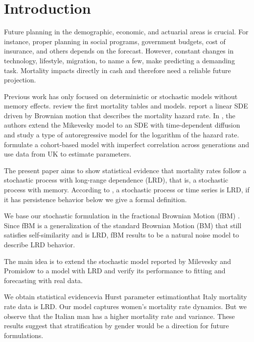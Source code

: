 \documentclass[smallextended]{svjour3}
\begin{document}
\section{Introduction} \label{intro}

        Future planning in the demographic, economic, and actuarial areas is
    crucial. For instance, proper planning in social programs, government
    budgets, cost of insurance, and others depends on the forecast. However,
    constant changes in technology, lifestyle, migration, to name a few, make
    predicting a demanding task.  Mortality impacts directly in cash and
    therefore need a reliable future projection.

        Previous work has only focused on deterministic or stochastic models
    without memory effects. \cite{pitacco2009modelling} review 
    the first mortality tables and models.
    \cite{mi-pr} report a linear SDE driven by Brownian motion that describes
    the mortality hazard rate. In \cite{gi-or-be}, the authors extend the
    Mikevesky model to an SDE with time-dependent diffusion and study a type of
    autoregressive model for the logarithm of the hazard rate.   
    \cite{je-lu-vi} formulate a cohort-based model with imperfect correlation
    across generations and use data from UK to estimate parameters.

        The present paper aims to show statistical evidence that mortality rates
    follow a stochastic process with long-range dependence (LRD), that is,
    a stochastic process with memory. According to \cite{ra}, a stochastic
    process or time series is LRD, if it has persistence behavior\textemdash
    below we give a formal definition.

        We base our stochastic formulation in the fractional Brownian Motion (fBM)
    \cite{ma-va}. Since fBM is a generalization of the standard Brownian Motion (BM)
    that still satisfies self-similarity and is LRD, fBM results to be a natural
    noise model to describe LRD behavior.

        The main idea is to extend the stochastic model reported by 
    Milevesky and Promislow to a model with LRD and verify its performance 
    to fitting and forecasting with real data.  

        We obtain statistical evidence\textemdash via Hurst parameter 
    estimation\textemdash that Italy mortality rate data is LRD. Our model 
    captures women's mortality rate dynamics. But we observe that the Italian
    man has a higher mortality rate and variance. These results suggest 
    that stratification by gender would be a direction for future formulations.
   
\end{document}
